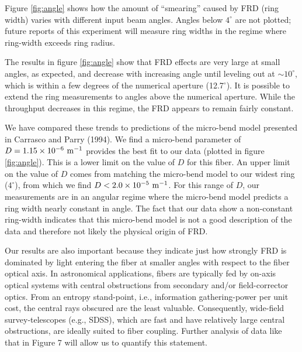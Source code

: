 Figure \ref{fig:angle} shows how the amount of ``smearing'' caused by
FRD (ring width) varies with different input beam angles. Angles below
$4^{\circ}$ are not plotted; future reports of this experiment will
measure ring widths in the regime where ring-width exceeds ring
radius.

The results in figure \ref{fig:angle} show that FRD effects are very
large at small angles, as expected, and decrease with increasing
angle until leveling out at $\sim 10^{\circ}$, which is within a few
degrees of the numerical aperture (12.7$^{\circ}$). It is possible to
extend the ring measurements to angles above the numerical
aperture. While the throughput decreases in this regime, the FRD
appears to remain fairly constant.

We have compared these trends to predictions of the micro-bend model
presented in Carrasco and Parry (1994)\cite{Carrasco}.  We find a micro-bend parameter of $D=1.15\times 10^{-6}~\mathrm{m^{-1}} $ provides the best fit to our data (plotted in figure \ref{fig:angle}). This is a lower limit on the value of $D$ for this fiber.
An upper limit on the value of $D$ comes from matching the micro-bend model to our widest ring ($4^{\circ}$), from which we find $D<2.0\times 10^{-5}~\mathrm{m^{-1}} $. For this range of $D$, our measurements  are in an angular regime where the
micro-bend model predicts a ring width nearly constant in angle. The
fact that our data show a non-constant ring-width indicates that this
micro-bend model is not a good description of the data and therefore not likely the physical origin of FRD.

Our results are also important because they indicate just how strongly
FRD is dominated by light entering the fiber at smaller angles with
respect to the fiber optical axis. In astronomical applications,
fibers are typically fed by on-axis optical systems with central
obstructions from secondary and/or field-corrector optics. From an
entropy stand-point, i.e., information gathering-power per unit cost,
the central rays obscured are the least valuable. Consequently,
wide-field survey-telescopes (e.g., SDSS\cite{York00,Gunn06}), which are fast and have
relatively large central obstructions, are ideally suited to fiber
coupling. Further analysis of data like that in Figure 7 will allow us
to quantify this statement.

